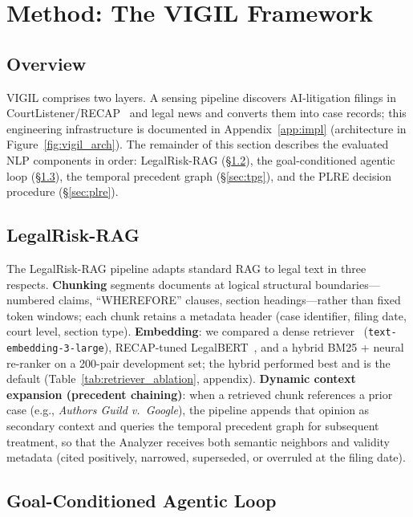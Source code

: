 \section{Method: The VIGIL Framework}
\label{sec:framework}
\subsection{Overview}

VIGIL comprises two layers. A sensing pipeline discovers AI-litigation filings in CourtListener/RECAP~\citep{courtlistener2023} and legal news and converts them into case records; this engineering infrastructure is documented in Appendix~\ref{app:impl} (architecture in Figure~\ref{fig:vigil_arch}). The remainder of this section describes the evaluated NLP components in order: LegalRisk-RAG (\S\ref{sec:legalrag}), the goal-conditioned agentic loop (\S\ref{sec:agentic_loop}), the temporal precedent graph (\S\ref{sec:tpg}), and the PLRE decision procedure (\S\ref{sec:plre}).

\subsection{LegalRisk-RAG}
\label{sec:legalrag}

The LegalRisk-RAG pipeline adapts standard RAG to legal text in three respects. \textbf{Chunking} segments documents at logical structural boundaries---numbered claims, ``WHEREFORE'' clauses, section headings---rather than fixed token windows; each chunk retains a metadata header (case identifier, filing date, court level, section type). \textbf{Embedding}: we compared a dense retriever~\citep{karpukhin2020dense} (\texttt{text-embedding-3-large}), RECAP-tuned LegalBERT~\citep{chalkidis2020legalbert}, and a hybrid BM25 + neural re-ranker on a 200-pair development set; the hybrid performed best and is the default (Table~\ref{tab:retriever_ablation}, appendix). \textbf{Dynamic context expansion (precedent chaining)}: when a retrieved chunk references a prior case (e.g., \emph{Authors Guild v.\ Google}), the pipeline appends that opinion as secondary context and queries the temporal precedent graph for subsequent treatment, so that the Analyzer receives both semantic neighbors and validity metadata (cited positively, narrowed, superseded, or overruled at the filing date).

\subsection{Goal-Conditioned Agentic Loop}
\label{sec:agentic_loop}

